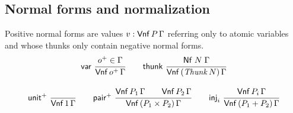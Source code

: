 \documentclass[sigplan,screen]{acmart}
\begin{document}
\subsection{Normal forms and normalization}

Positive normal forms are values $v : \mathsf{Vnf}\,P\,\Gamma$
referring only to atomic variables and
whose thunks only
contain negative normal forms.
\begin{gather*}
  \nru{\tvar}{\patom \in \Gamma}{\PValNf {\patom} \Gamma}
\qquad
  \nru{\tthunk}{\Nf N \Gamma}{\PValNfP{\Thunk N}\Gamma}
\\[2ex]
  \nru{\punit}{}{\PValNf{\tyone}\Gamma}
\qquad
  \nru{\ppair}
      {\PValNf{P_1}\Gamma \qquad \PValNf{P_2}\Gamma}
      {\PValNfP{P_1 \times P_2}\Gamma}
\qquad
  \nru{\tinj_i}{\PValNf{P_i}\Gamma}{\PValNfP{P_1 + P_2}\Gamma}
\end{gather*}
\end{document}
